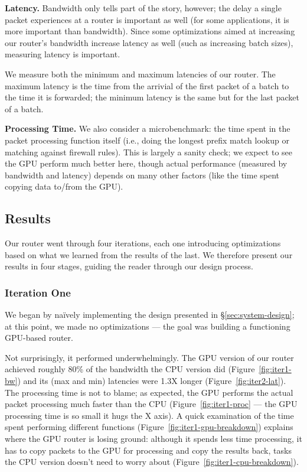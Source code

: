 \medskip \noindent \textbf{Latency.} Bandwidth only tells part of the story,
however; the delay a single packet experiences at a router is important as well
(for some applications, it is more important than bandwidth). Since some
optimizations aimed at increasing our router's bandwidth increase latency as
well (such as increasing batch sizes), measuring latency is important.

We measure both the minimum and maximum latencies of our router. The maximum
latency is the time from the arrivial of the first packet of a batch to the
time it is forwarded; the minimum latency is the same but for the last packet
of a batch.

\medskip \noindent \textbf{Processing Time.} We also consider a microbenchmark:
the time spent in the packet processing function itself (i.e., doing the longest
prefix match lookup or matching against firewall rules). This is largely a
sanity check; we expect to see the GPU perform much better here, though actual
performance (measured by bandwidth and latency) depends on many other factors
(like the time spent copying data to/from the GPU).


\subsection{Results}
\label{sec:results}

Our router went through four iterations, each one introducing optimizations
based on what we learned from the results of the last. We therefore present our
results in four stages, guiding the reader through our design process.

\subsubsection{Iteration One}

We began by na\"{i}vely implementing the design presented in
\S\ref{sec:system-design}; at this point, we made no optimizations --- the goal
was building a functioning GPU-based router.

Not surprisingly, it performed underwhelmingly. The GPU version of our router
achieved roughly 80\% of the bandwidth the CPU version did
(Figure~\ref{fig:iter1-bw}) and its (max and min) latencies were 1.3X longer
(Figure~\ref{fig:iter2-lat}). The processing time is not to blame; as expected,
the GPU performs the actual packet processing much faster than the CPU
(Figure~\ref{fig:iter1-proc} --- the GPU processing time is so small it hugs
the X axis). A quick examination of the time spent performing different
functions (Figure~\ref{fig:iter1-gpu-breakdown}) explains where the GPU router
is losing ground: although it spends less time processing, it has to copy
packets to the GPU for processing and copy the results back, tasks the CPU
version doesn't need to worry about (Figure~\ref{fig:iter1-cpu-breakdown}).

